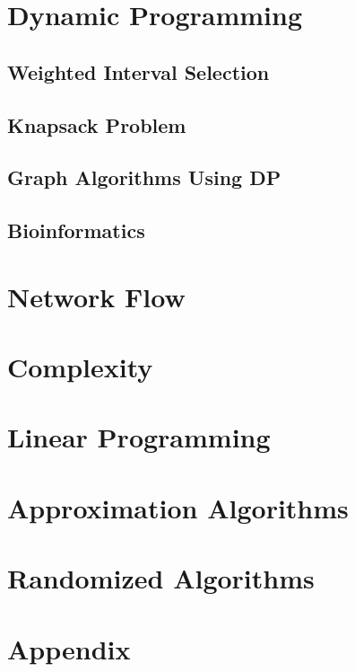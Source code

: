 \documentclass[11pt,fleqn,dvipsnames]{book} %
\begin{document}
\part{Dynamic Programming}

\chapter{Weighted Interval Selection}


\chapter{Knapsack Problem}


\chapter{Graph Algorithms Using DP}


\chapter{Bioinformatics}


\part{Network Flow}

\part{Complexity}

\part{Linear Programming}

\part{Approximation Algorithms}

\part{Randomized Algorithms}

\part*{Appendix}
\appendix
\end{document}
